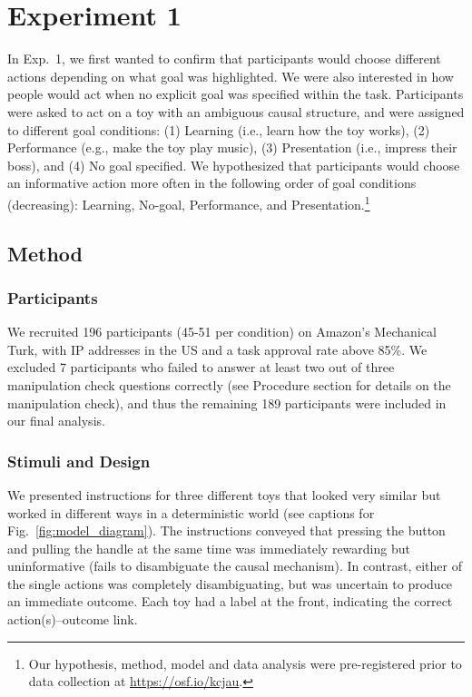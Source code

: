 \documentclass[10pt, letterpaper]{article}
\begin{document}
\section{Experiment 1}\label{experiment-1}

In Exp.~1, we first wanted to confirm that participants would choose
different actions depending on what goal was highlighted. We were also
interested in how people would act when no explicit goal was specified
within the task. Participants were asked to act on a toy with an
ambiguous causal structure, and were assigned to different goal
conditions: (1) Learning (i.e., learn how the toy works), (2)
Performance (e.g., make the toy play music), (3) Presentation (i.e.,
impress their boss), and (4) No goal specified. We hypothesized that
participants would choose an informative action more often in the
following order of goal conditions (decreasing): Learning, No-goal,
Performance, and
Presentation.\footnote{Our hypothesis, method, model and data analysis were pre-registered prior to data collection at \url{https://osf.io/kcjau}.}

\subsection{Method}\label{method}

\subsubsection{Participants}\label{participants}

We recruited 196 participants (45-51 per condition) on Amazon's
Mechanical Turk, with IP addresses in the US and a task approval rate
above 85\%. We excluded 7 participants who failed to answer at least two
out of three manipulation check questions correctly (see Procedure
section for details on the manipulation check), and thus the remaining
189 participants were included in our final analysis.

\subsubsection{Stimuli and Design}\label{stimuli-and-design}

We presented instructions for three different toys that looked very
similar but worked in different ways in a deterministic world (see
captions for Fig.~\ref{fig:model_diagram}). The instructions conveyed
that pressing the button and pulling the handle at the same time was
immediately rewarding but uninformative (fails to disambiguate the
causal mechanism). In contrast, either of the single actions was
completely disambiguating, but was uncertain to produce an immediate
outcome. Each toy had a label at the front, indicating the correct
action(s)--outcome link.
\end{document}
